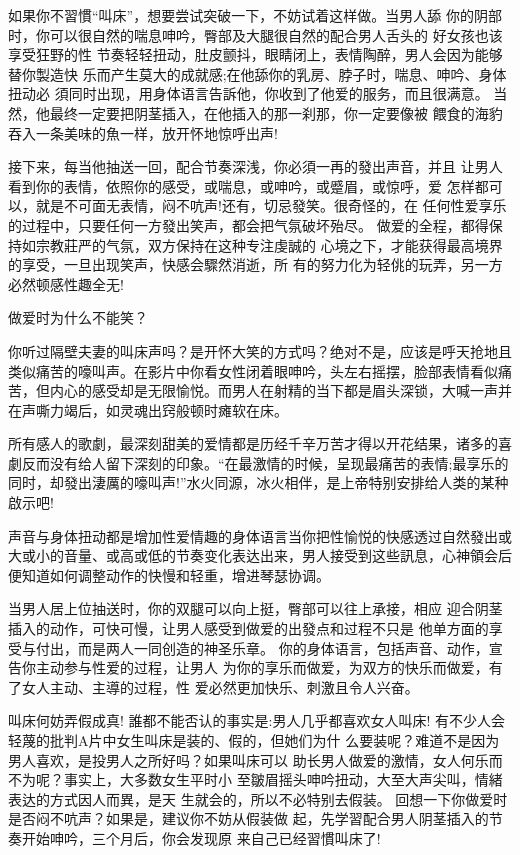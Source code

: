 \documentclass[12pt,UTF8]{ctexbook}
\begin{document}
如果你不習慣“叫床”，想要尝试突破一下，不妨试着这样做。当男人舔
你的阴部时，你可以很自然的喘息呻吟，臀部及大腿很自然的配合男人舌头的
好女孩也该享受狂野的性
节奏轻轻扭动，肚皮颤抖，眼睛闭上，表情陶醉，男人会因为能够替你製造快
乐而产生莫大的成就感;在他舔你的乳房、脖子时，喘息、呻吟、身体扭动必
須同时出现，用身体语言告訴他，你收到了他爱的服务，而且很满意。
当然，他最终一定要把阴茎插入，在他插入的那一刹那，你一定要像被
餵食的海豹吞入一条美味的魚一样，放开怀地惊呼出声!

接下来，每当他抽送一回，配合节奏深浅，你必須一再的發出声音，并且
让男人看到你的表情，依照你的感受，或喘息，或呻吟，或蹙眉，或惊呼，爱
怎样都可以，就是不可面无表情，闷不吭声!还有，切忌發笑。很奇怪的，在
任何性爱享乐的过程中，只要任何一方發出笑声，都会把气氛破坏殆尽。
做爱的全程，都得保持如宗教莊严的气氛，双方保持在这种专注虔誠的
心境之下，才能获得最高境界的享受，一旦出现笑声，快感会驟然消逝，所
有的努力化为轻佻的玩弄，另一方必然顿感性趣全无!

做爱时为什么不能笑？

你听过隔壁夫妻的叫床声吗？是开怀大笑的方式吗？绝对不是，应该是呼天抢地且类似痛苦的嚎叫声。在影片中你看女性闭着眼呻吟，头左右摇摆，脸部表情看似痛苦，但内心的感受却是无限愉悦。而男人在射精的当下都是眉头深锁，大喊一声并在声嘶力竭后，如灵魂出窍般顿时瘫软在床。

所有感人的歌劇，最深刻甜美的爱情都是历经千辛万苦才得以开花结果，诸多的喜劇反而没有给人留下深刻的印象。“在最激情的时候，呈现最痛苦的表情;最享乐的同时，却發出淒厲的嚎叫声!”水火同源，冰火相伴，是上帝特别安排给人类的某种啟示吧!

声音与身体扭动都是增加性爱情趣的身体语言当你把性愉悦的快感透过自然發出或大或小的音量、或高或低的节奏变化表达出来，男人接受到这些訊息，心神領会后便知道如何调整动作的快慢和轻重，增进琴瑟协调。

当男人居上位抽送时，你的双腿可以向上挺，臀部可以往上承接，相应
迎合阴茎插入的动作，可快可慢，让男人感受到做爱的出發点和过程不只是
他单方面的享受与付出，而是两人一同创造的神圣乐章。
你的身体语言，包括声音、动作，宣告你主动参与性爱的过程，让男人
为你的享乐而做爱，为双方的快乐而做爱，有了女人主动、主導的过程，性
爱必然更加快乐、刺激且令人兴奋。

叫床何妨弄假成真!
誰都不能否认的事实是:男人几乎都喜欢女人叫床!
有不少人会轻蔑的批判A片中女生叫床是装的、假的，但她们为什
么要装呢？难道不是因为男人喜欢，是投男人之所好吗？如果叫床可以
助长男人做爱的激情，女人何乐而不为呢？事实上，大多数女生平时小
至皺眉摇头呻吟扭动，大至大声尖叫，情緒表达的方式因人而異，是天
生就会的，所以不必特别去假装。
回想一下你做爱时是否闷不吭声？如果是，建议你不妨从假装做
起，先学習配合男人阴茎插入的节奏开始呻吟，三个月后，你会发现原
来自己已经習慣叫床了!
\end{document}
